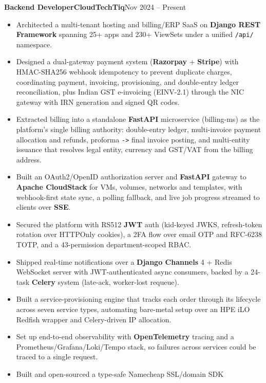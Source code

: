 \documentclass[11pt,a4paper]{article}
\newcommand{\entry}[3]{%
  \vspace{4.5pt}\noindent\textbf{#1}\hfill\textbf{#2}\hfill{\color{subtlegray}#3}\par\vspace{2pt}}
\begin{document}
\entry{Backend Developer}{CloudTechTiq}{Nov 2024 -- Present}
\begin{itemize}
  \item Architected a multi-tenant hosting and billing/ERP SaaS on \textbf{Django
        REST Framework} spanning 25+ apps and 230+ ViewSets under a unified
        \texttt{/api/} namespace.
  \item Designed a dual-gateway payment system (\textbf{Razorpay} +
        \textbf{Stripe}) with HMAC-SHA256 webhook idempotency to prevent duplicate
        charges, coordinating payment, invoicing, provisioning, and double-entry
        ledger reconciliation, plus Indian GST e-invoicing (EINV-2.1) through the
        NIC gateway with IRN generation and signed QR codes.
  \item Extracted billing into a standalone \textbf{FastAPI} microservice
        (billing-ms) as the platform's single billing authority: double-entry
        ledger, multi-invoice payment allocation and refunds, proforma
        \texttt{->} final invoice posting, and multi-entity issuance that
        resolves legal entity, currency and GST/VAT from the billing address.
  \item Built an OAuth2/OpenID authorization server and \textbf{FastAPI}
        gateway to \textbf{Apache CloudStack} for VMs, volumes, networks and
        templates, with webhook-first state sync, a polling fallback, and live
        job progress streamed to clients over \textbf{SSE}.
  \item Secured the platform with RS512 \textbf{JWT} auth (kid-keyed JWKS,
        refresh-token rotation over HTTPOnly cookies), a 2FA flow over email OTP
        and RFC-6238 TOTP, and a 43-permission department-scoped RBAC.
  \item Shipped real-time notifications over a \textbf{Django Channels} 4 + Redis
        WebSocket server with JWT-authenticated async consumers, backed by a
        24-task \textbf{Celery} system (late-ack, worker-lost requeue).
  \item Built a service-provisioning engine that tracks each order through its
        lifecycle across seven service types, automating bare-metal setup over an
        HPE iLO Redfish wrapper and Celery-driven IP allocation.
  \item Set up end-to-end observability with \textbf{OpenTelemetry} tracing and a
        Prometheus/Grafana/Loki/Tempo stack, so failures across services could be
        traced to a single request.
  \item Built and open-sourced a type-safe Namecheap SSL/domain SDK

\end{itemize}
\end{document}
